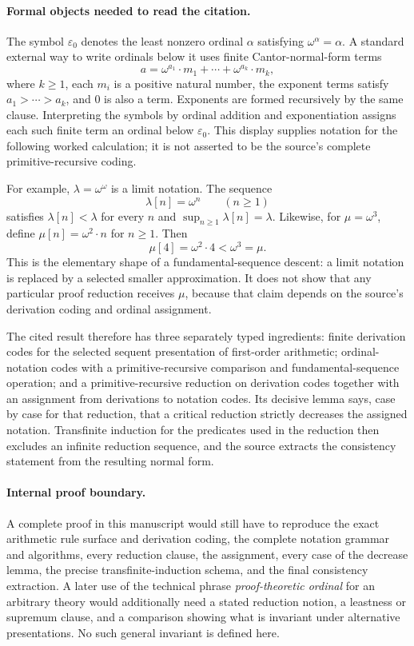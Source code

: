 \documentclass[11pt,oneside,openany]{book}
\theoremstyle{definition}
\theoremstyle{plain}
\theoremstyle{remark}
\begin{document}
\paragraph{Formal objects needed to read the citation.}
The symbol \(\varepsilon_0\) denotes the least nonzero ordinal
\(\alpha\) satisfying \(\omega^\alpha=\alpha\).  A standard external way to
write ordinals below it uses finite Cantor-normal-form terms
\[
  a=\omega^{a_1}\cdot m_1+\cdots+
    \omega^{a_k}\cdot m_k,
\]
where \(k\geq1\), each \(m_i\) is a positive natural number, the exponent
terms satisfy \(a_1>\cdots>a_k\), and \(0\) is also a term.  Exponents are
formed recursively by the same clause.  Interpreting the symbols by ordinal
addition and exponentiation assigns each such finite term an ordinal below
\(\varepsilon_0\).  This display supplies notation for the following worked
calculation; it is not asserted to be the source's complete primitive-recursive
coding.

For example, \(\lambda=\omega^\omega\) is a limit notation.  The sequence
\[
  \lambda[n]=\omega^n\qquad(n\geq1)
\]
satisfies \(\lambda[n]<\lambda\) for every \(n\) and
\(\sup_{n\geq1}\lambda[n]=\lambda\).  Likewise, for
\(\mu=\omega^3\), define \(\mu[n]=\omega^2\cdot n\) for \(n\geq1\).  Then
\[
  \mu[4]=\omega^2\cdot4<\omega^3=\mu.
\]
This is the elementary shape of a fundamental-sequence descent: a limit
notation is replaced by a selected smaller approximation.  It does not show
that any particular proof reduction receives \(\mu\), because that claim
depends on the source's derivation coding and ordinal assignment.

The cited result therefore has three separately typed ingredients: finite
derivation codes for the selected sequent presentation of first-order
arithmetic; ordinal-notation codes with a primitive-recursive comparison and
fundamental-sequence operation; and a primitive-recursive reduction on
derivation codes together with an assignment from derivations to notation
codes.  Its decisive lemma says, case by case for that reduction, that a
critical reduction strictly decreases the assigned notation.  Transfinite
induction for the predicates used in the reduction then excludes an infinite
reduction sequence, and the source extracts the consistency statement from
the resulting normal form.

\paragraph{Internal proof boundary.}
A complete proof in this manuscript would still have to reproduce the exact
arithmetic rule surface and derivation coding, the complete notation grammar
and algorithms, every reduction clause, the assignment, every case of the
decrease lemma, the precise transfinite-induction schema, and the final
consistency extraction.  A later use of the technical phrase
\emph{proof-theoretic ordinal} for an arbitrary theory would additionally need
a stated reduction notion, a leastness or supremum clause, and a comparison
showing what is invariant under alternative presentations.  No such general
invariant is defined here.
\end{document}
